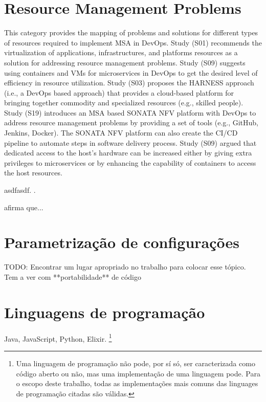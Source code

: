 \section{Resource Management Problems}
This category provides the mapping of problems and solutions for different types of resources required to implement MSA in DevOps. Study (S01) recommends the virtualization of applications, infrastructures, and platforms resources as a solution for addressing resource management problems. Study (S09) suggests using containers and VMs for microservices in DevOps to get the desired level of efficiency in resource utilization. Study (S03) proposes the HARNESS approach (i.e., a DevOps based approach) that provides a cloud-based platform for bringing together commodity and specialized resources (e.g., skilled people). Study (S19) introduces an MSA based SONATA NFV platform with DevOps to address resource management problems by providing a set of tools (e.g., GitHub, Jenkins, Docker). The SONATA NFV platform can also create the CI/CD pipeline to automate steps in software delivery process. Study (S09) argued that dedicated access to the host’s hardware can be increased either by giving extra privileges to microservices or by enhancing the capability of containers to access the host resources.

asdfasdf. \cite{Tanembaum-Steen}.

 afirma que...

\section{Parametrização de configurações}
TODO: Encontrar um lugar apropriado no trabalho para colocar esse tópico. Tem a ver com **portabilidade** de código

\section{Linguagens de programação}
Java, JavaScript, Python, Elixir. \footnote{Uma linguagem de programação não pode, por sí só, ser caracterizada como código aberto ou não, mas uma implementação de uma linguagem pode. Para o escopo deste trabalho, todas as implementações mais comuns das linguages de programação citadas são válidas.}


